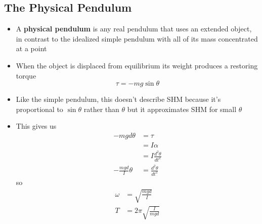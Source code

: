 \documentclass{article}
\begin{document}
\subsection{The Physical Pendulum}

\begin{itemize}
    \item A \textbf{physical pendulum} is any real pendulum that uses an extended object, in contrast to the idealized simple pendulum with all of its mass concentrated at a point

    \item When the object is displaced from equilibrium its weight produces a restoring torque \[\tau = -mg\sin\theta\]

    \item Like the simple pendulum, this doesn't describe SHM because it's proportional to $\sin\theta$ rather than $\theta$ but it approximates SHM for small $\theta$

    \item This gives us
          \begin{align*}
              -mgd\theta           & = \tau                     \\
                                   & = I\alpha                  \\
                                   & = I\frac{d^2 \theta}{dt^2} \\
              -\frac{mgd}{I}\theta & = \frac{d^2 \theta}{dt^2}
          \end{align*}
          so
          \begin{align*}
              \omega & = \sqrt{\frac{mgd}{I}}      \\
              T      & = 2\pi \sqrt{\frac{I}{mgd}}
          \end{align*}
\end{itemize}
\end{document}
